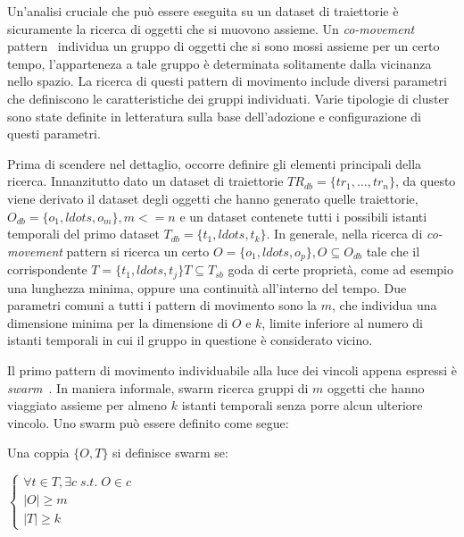 Un'analisi cruciale che può essere eseguita su un dataset di traiettorie è sicuramente
la ricerca di oggetti che si muovono assieme.
Un \textit{co-movement} pattern~\cite{zheng2015trajectory} individua un gruppo di oggetti che si sono mossi assieme
per un certo tempo, l'apparteneza a tale gruppo è determinata solitamente dalla vicinanza nello
spazio.
La ricerca di questi pattern di movimento include diversi parametri che definiscono le
caratteristiche dei gruppi individuati. Varie tipologie di cluster sono state definite
in letteratura sulla base dell'adozione e configurazione di questi parametri.

Prima di scendere nel dettaglio, occorre definire gli elementi principali della ricerca.
Innanzitutto dato un dataset di traiettorie \(TR_{db} = \{tr_{1}, \ldots, tr_{n}\} \), da questo viene derivato il dataset
degli oggetti che hanno generato quelle traiettorie, \(O_{db} = \{ o_{1}, ldots, o_{m} \}, m <= n\)
e un dataset contenete tutti i possibili istanti temporali del primo dataset
\(T_{db} = \{t_{1}, ldots, t_{k}\} \).
In generale, nella ricerca di \textit{co-movement} pattern si ricerca un certo \(O = \{ o_{1}, ldots, o_{p} \}, O \subseteq O_{db} \)
tale che il corrispondente \(T = \{t_{1}, ldots, t_{j}\} T \subseteq T_{sb}\) goda di certe proprietà, come
ad esempio una lunghezza minima, oppure una continuità all'interno del tempo.
Due parametri comuni a tutti i pattern di movimento sono la \(m\), che individua una
dimensione minima per la dimensione di \(O\) e \(k\), limite inferiore al numero
di istanti temporali in cui il gruppo in questione è considerato vicino.

Il primo pattern di movimento individuabile alla luce dei vincoli appena espressi è
\textit{swarm}~\cite{li2010swarm}. In maniera informale, swarm ricerca gruppi di \(m\) oggetti che hanno viaggiato
assieme per almeno \(k\) istanti temporali senza porre alcun ulteriore vincolo.
Uno swarm può essere definito come segue:

\begin{definition}[Swarm]\label{definition:swarm}

  Una coppia \( \{ O, T \} \) si definisce swarm se:

  \begin{center}

    \(
      \begin{cases}
         \forall t \in T,\exists c \; s.t. \; O \in c \\
         |O| \geq m \\
         |T| \geq k

      \end{cases}
      \)

  \end{center}
\end{definition}

